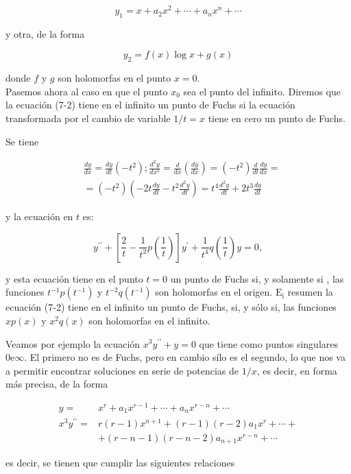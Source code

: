 \documentclass[10pt]{article}
\theoremstyle{plain}
\theoremstyle{definition}
\theoremstyle{remark}
\begin{document}
$$
y_{1}=x+a_{2} x^{2}+\cdots+a_{n} x^{n}+\cdots
$$

y otra, de la forma

$$
y_{2}=f(x) \log x+g(x)
$$

donde $f$ y $g$ son holomorfas en el punto $x=0$.\\
Pasemos ahora al caso en que el punto $x_{0}$ sea el punto del infinito. Diremos que la ecuación (7-2) tiene en el infinito un punto de Fuchs si la ecuación transformada por el cambio de variable $1 / t=x$ tiene en cero un punto de Fuchs.

Se tiene

$$
\begin{aligned}
& \frac{d y}{d x}=\frac{d y}{d t}\left(-t^{2}\right) ; \frac{d^{2} y}{d x^{2}}=\frac{d}{d x}\left(\frac{d y}{d x}\right)=\left(-t^{2}\right) \frac{d}{d t} \frac{d y}{d x}= \\
& =\left(-t^{2}\right)\left(-2 t \frac{d y}{d t}-t^{2} \frac{d^{2} y}{d t}\right)=t^{4} \frac{d^{2} y}{d t}+2 t^{3} \frac{d y}{d t}
\end{aligned}
$$

y la ecuación en $t$ es:

$$
y^{\prime \prime}+\left[\frac{2}{t}-\frac{1}{t^{2}} p\left(\frac{1}{t}\right)\right] y^{\prime}+\frac{1}{t^{4}} q\left(\frac{1}{t}\right) y=0,
$$

y esta ecuación tiene en el punto $t=0$ un punto de Fuchs si, y solamente si , las funciones $t^{-1} p\left(t^{-1}\right)$ y $t^{-2} q\left(t^{-1}\right)$ son holomorfas en el origen. $\mathrm{E}_{\mathrm{i}}$ resumen la ecuación (7-2) tiene en el infinito un punto de Fuchs, si, y sólo si, las funciones $x p(x)$ y $x^{2} q(x)$ son holomorfas en el infinito.

Veamos por ejemplo la ecuación $x^{3} y^{\prime \prime}+y=0$ que tiene como puntos singulares $0 \mathrm{e} \infty$. El primero no es de Fuchs, pero en cambio sílo es el segundo, lo que nos va a permitir encontrar soluciones en serie de potencias de $1 / x$, es decir, en forma más precisa, de la forma

$$
\begin{aligned}
y= & x^{r}+a_{1} x^{r-1}+\cdots+a_{n} x^{r-n}+\cdots \\
x^{3} y^{\prime \prime}= & r(r-1) x^{n+1}+(r-1)(r-2) a_{1} x^{r}+\cdots+ \\
& +(r-n-1)(r-n-2) a_{n+1} x^{r-n}+\cdots
\end{aligned}
$$

es decir, se tienen que cumplir las siguientes relaciones
\end{document}
